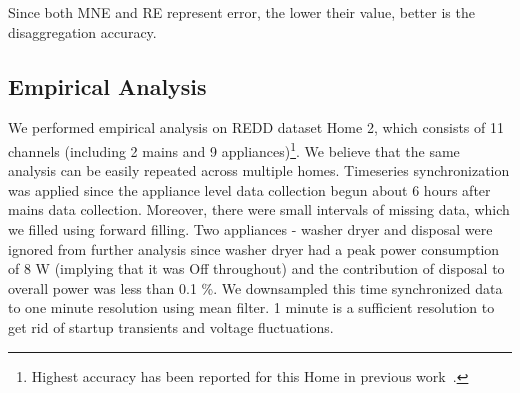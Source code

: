 \documentclass[conference]{IEEEtran}
\begin{document}
\noindent Since both MNE and RE represent error, the lower their value, better is the disaggregation accuracy. 




\vspace{-5mm}
\subsection{Empirical Analysis}
\vspace{-2mm}
\noindent We performed empirical analysis on REDD dataset Home 2, which consists of 11 channels (including 2 mains and 9 appliances)\footnote{Highest accuracy has been reported for this Home in previous work~\cite{redd}.}. We believe that the same analysis can be easily repeated across multiple homes. Timeseries synchronization was applied since the appliance level data collection begun about 6 hours after mains data collection. Moreover, there were small intervals of missing data, which we filled using forward filling. Two appliances - washer dryer and disposal were ignored from further analysis since washer dryer had a peak power consumption of 8 W (implying that it was Off throughout) and the contribution of disposal to overall power was less than 0.1 \%.  We downsampled this time synchronized data to one minute resolution using mean filter. 1 minute is a sufficient resolution to get rid of startup transients and voltage fluctuations. 
\end{document}
